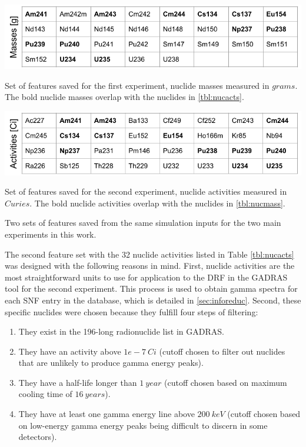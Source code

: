 \begin{table}[!htb]
  \centering
  \begin{subtable}{\linewidth}
    \centering
    \includegraphics[width=\linewidth]{./chapters/method/nucmass_feats.png}
    \caption{Set of features saved for the first experiment, nuclide masses 
             measured in $grams$. The bold nuclide masses overlap with the 
             nuclides in \ref{tbl:nucacts}.}
    \label{tbl:nucmass}
    \vspace*{5mm}
  \end{subtable}
  \begin{subtable}{\linewidth}
    \centering
    \includegraphics[width=\linewidth]{./chapters/method/nucacts_feats.png}
    \caption{Set of features saved for the second experiment, nuclide activities
             measured in $Curies$. The bold nuclide activities overlap with the 
             nuclides in \ref{tbl:nucmass}.}
    \label{tbl:nucacts}
  \end{subtable}%
  \caption{Two sets of features saved from the same simulation inputs for the 
           two main experiments in this work.}
  \label{tbl:nucfeats}
\end{table}

The second feature set with the 32 nuclide activities listed in Table
\ref{tbl:nucacts} was designed with the following reasons in mind. First,
nuclide activities are the most straightforward units to use for application to
the \gls{DRF} in the \gls{GADRAS} tool for the second experiment. This process
is used to obtain gamma spectra for each \gls{SNF} entry in the database, which
is detailed in \ref{sec:inforeduc}.  Second, these specific nuclides were
chosen because they fulfill four steps of filtering:
\begin{enumerate}
  \item They exist in the 196-long radionuclide list in \gls{GADRAS}.
  \item They have an activity above $1e-7\:Ci$ (cutoff chosen to filter out
  nuclides that are unlikely to produce gamma energy peaks).
  \item They have a half-life longer than $1\:year$ (cutoff chosen based on
  maximum cooling time of $16\:years$).
  \item They have at least one gamma energy line above $200\:keV$ (cutoff
  chosen based on low-energy gamma energy peaks being difficult to discern in
  some detectors).
\end{enumerate}

